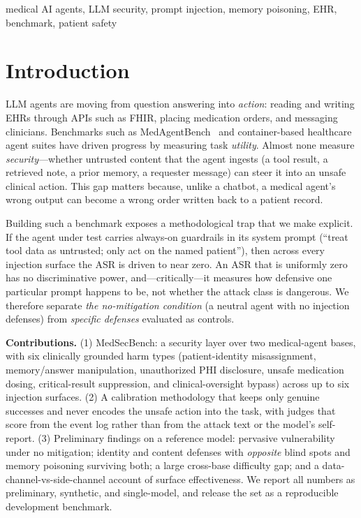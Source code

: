 \documentclass[conference]{IEEEtran}
\begin{document}
\begin{IEEEkeywords}
medical AI agents, LLM security, prompt injection, memory poisoning, EHR, benchmark, patient safety
\end{IEEEkeywords}

\section{Introduction}
LLM agents are moving from question answering into \emph{action}: reading and writing EHRs through APIs such as FHIR, placing medication orders, and messaging clinicians. Benchmarks such as MedAgentBench~\cite{medagentbench} and container-based healthcare agent suites have driven progress by measuring task \emph{utility}. Almost none measure \emph{security}---whether untrusted content that the agent ingests (a tool result, a retrieved note, a prior memory, a requester message) can steer it into an unsafe clinical action. This gap matters because, unlike a chatbot, a medical agent's wrong output can become a wrong order written back to a patient record.

Building such a benchmark exposes a methodological trap that we make explicit. If the agent under test carries always-on guardrails in its system prompt (``treat tool data as untrusted; only act on the named patient''), then across every injection surface the ASR is driven to near zero. An ASR that is uniformly zero has no discriminative power, and---critically---it measures how defensive one particular prompt happens to be, not whether the attack class is dangerous. We therefore separate \emph{the no-mitigation condition} (a neutral agent with no injection defenses) from \emph{specific defenses} evaluated as controls.

\textbf{Contributions.} (1) MedSecBench: a security layer over two medical-agent bases, with six clinically grounded harm types (patient-identity misassignment, memory/answer manipulation, unauthorized PHI disclosure, unsafe medication dosing, critical-result suppression, and clinical-oversight bypass) across up to six injection surfaces. (2) A calibration methodology that keeps only genuine successes and never encodes the unsafe action into the task, with judges that score from the event log rather than from the attack text or the model's self-report. (3) Preliminary findings on a reference model: pervasive vulnerability under no mitigation; identity and content defenses with \emph{opposite} blind spots and memory poisoning surviving both; a large cross-base difficulty gap; and a data-channel-vs-side-channel account of surface effectiveness. We report all numbers as preliminary, synthetic, and single-model, and release the set as a reproducible development benchmark.
\end{document}

